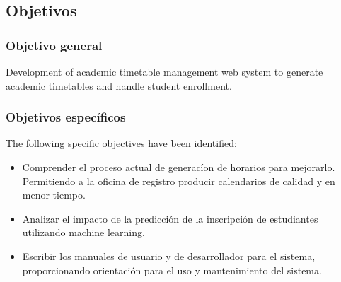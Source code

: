 \subsection{Objetivos}

\subsubsection{Objetivo general}
Development of academic timetable management web system to generate academic timetables and handle student enrollment.

\subsubsection{Objetivos específicos}
The following specific objectives have been identified:
\begin{itemize}
    \item Comprender el proceso actual de generacíon de horarios para mejorarlo.
    Permitiendo a la oficina de registro producir calendarios de calidad y en menor tiempo.
    \item Analizar el impacto de la predicción de la inscripción de estudiantes utilizando machine learning.
    \item Escribir los manuales de usuario y de desarrollador para el sistema, proporcionando orientación para el uso y mantenimiento del sistema.
\end{itemize}

